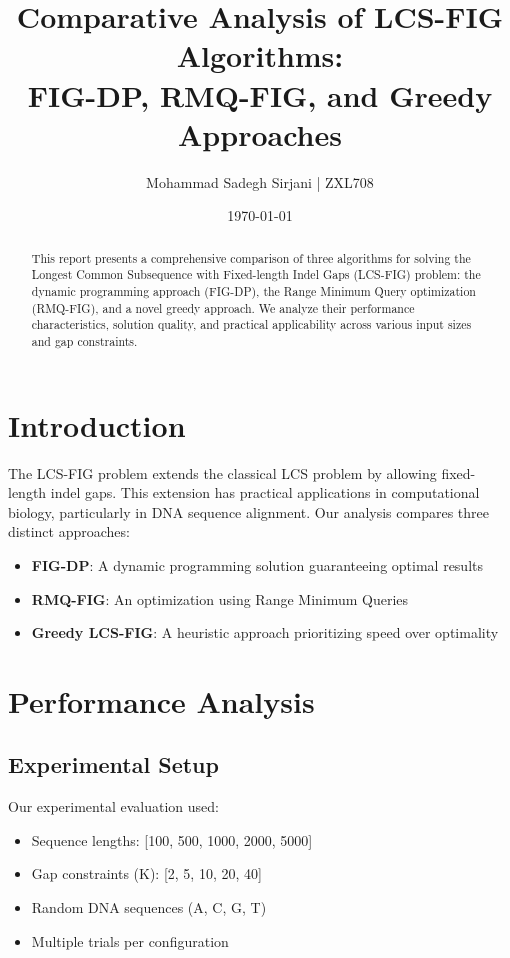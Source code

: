\documentclass[12pt]{article}
\title{Comparative Analysis of LCS-FIG Algorithms:\\FIG-DP, RMQ-FIG, and Greedy Approaches}
\author{Mohammad Sadegh Sirjani | ZXL708}
\date{\today}
\begin{document}
\maketitle
\newpage

\begin{abstract}
This report presents a comprehensive comparison of three algorithms for solving the Longest Common Subsequence with Fixed-length Indel Gaps (LCS-FIG) problem: the dynamic programming approach (FIG-DP), the Range Minimum Query optimization (RMQ-FIG), and a novel greedy approach. We analyze their performance characteristics, solution quality, and practical applicability across various input sizes and gap constraints.
\end{abstract}

\section{Introduction}
The LCS-FIG problem extends the classical LCS problem by allowing fixed-length indel gaps. This extension has practical applications in computational biology, particularly in DNA sequence alignment. Our analysis compares three distinct approaches:
\begin{itemize}
    \item \textbf{FIG-DP}: A dynamic programming solution guaranteeing optimal results
    \item \textbf{RMQ-FIG}: An optimization using Range Minimum Queries
    \item \textbf{Greedy LCS-FIG}: A heuristic approach prioritizing speed over optimality
\end{itemize}

\section{Performance Analysis}
\subsection{Experimental Setup}
Our experimental evaluation used:
\begin{itemize}
    \item Sequence lengths: [100, 500, 1000, 2000, 5000]
    \item Gap constraints (K): [2, 5, 10, 20, 40]
    \item Random DNA sequences (A, C, G, T)
    \item Multiple trials per configuration
\end{itemize}
\end{document}
